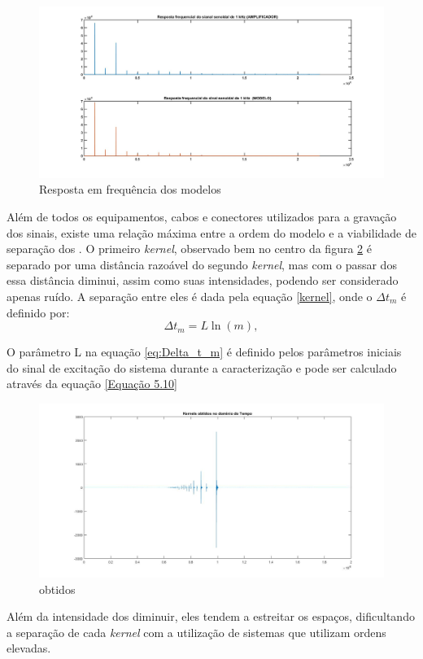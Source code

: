\begin{figure}[!htb]
	\centering
	\includegraphics[width=1\linewidth]{figuras/Resp_freq}
	\caption{Resposta em frequência dos modelos}
	\label{fig:tcc2fft}
\end{figure}
Além de todos os equipamentos, cabos e conectores utilizados para a gravação dos sinais, existe uma relação máxima entre a ordem do modelo e a viabilidade de separação dos . O primeiro \textit{kernel}, observado bem no centro da figura \ref{fig:10sweepkernels} é separado por uma distância razoável do segundo \textit{kernel}, mas com o passar dos  essa distância diminui, assim como suas intensidades, podendo ser considerado apenas ruído. A separação entre eles é dada pela equação \ref{kernel}, onde o $\Delta t_{m}$ é definido por:
\begin{equation}
\Delta t_{m} =  L \ln(m),
\label{eq:Delta_t_m}
\end{equation}

O parâmetro L na equação \ref{eq:Delta_t_m} é definido pelos parâmetros iniciais do sinal de excitação do sistema durante a caracterização e pode ser calculado através da equação \ref{Equação 5.10}
\begin{figure}
	\centering
	\includegraphics[width=0.7\linewidth]{figuras/10Sweep_Kernels}
	\caption{ obtidos}
	\label{fig:10sweepkernels}
\end{figure}

Além da intensidade dos  diminuir, eles tendem a estreitar os espaços, dificultando a separação de cada \textit{kernel} com a utilização de sistemas que utilizam ordens elevadas.
